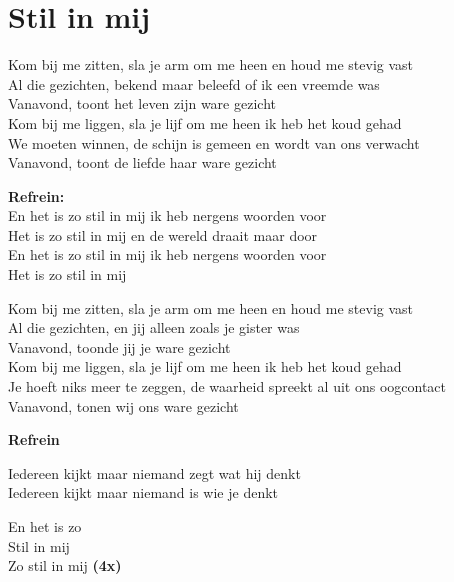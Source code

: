 \section{Stil in mij}
Kom bij me zitten, sla je arm om me heen en houd me stevig vast\\
Al die gezichten, bekend maar beleefd of ik een vreemde was\\
Vanavond, toont het leven zijn ware gezicht\\
Kom bij me liggen, sla je lijf om me heen ik heb het koud gehad\\
We moeten winnen, de schijn is gemeen en wordt van ons verwacht\\
Vanavond, toont de liefde haar ware gezicht

\textbf{Refrein:}\\
En het is zo stil in mij ik heb nergens woorden voor\\
Het is zo stil in mij en de wereld draait maar door\\
En het is zo stil in mij ik heb nergens woorden voor\\
Het is zo stil in mij

Kom bij me zitten, sla je arm om me heen en houd me stevig vast\\
Al die gezichten, en jij alleen zoals je gister was\\
Vanavond, toonde jij je ware gezicht\\
Kom bij me liggen, sla je lijf om me heen ik heb het koud gehad\\
Je hoeft niks meer te zeggen, de waarheid spreekt al uit ons oogcontact\\
Vanavond, tonen wij ons ware gezicht

\textbf{Refrein}

Iedereen kijkt maar niemand zegt wat hij denkt\\
Iedereen kijkt maar niemand is wie je denkt

En het is zo\\
Stil in mij\\
Zo stil in mij \textbf{(4x)}
